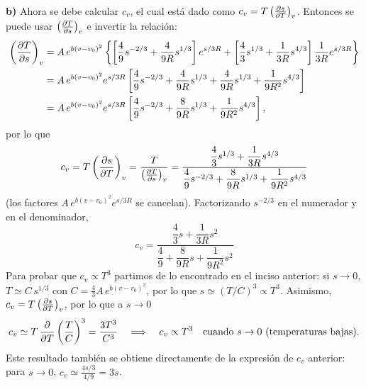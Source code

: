 \begin{solucion}
  \textbf{b)} Ahora se debe calcular $c_v$, el cual está dado como $c_v=T\left(\frac{\partial s}{\partial T}\right)_{v}$. Entonces se
  puede usar $\left(\frac{\partial T}{\partial s}\right)_{v}$ e invertir la relación:
  \begin{align*}
    \left(\frac{\partial T}{\partial s}\right)_{v}&=A\,e^{b(v-v_0)^{2}}\left\{\left[\frac{4}{9}s^{-2/3}+\frac{4}{9R}s^{1/3}\right]e^{s/3R}+\left[\frac{4}{3}s^{1/3}+\frac{1}{3R}s^{4/3}\right]\frac{1}{3R}e^{s/3R}\right\}\\
    &=A\,e^{b(v-v_0)^{2}}e^{s/3R}\left[\frac{4}{9}s^{-2/3}+\frac{4}{9R}s^{1/3}+\frac{4}{9R}s^{1/3}+\frac{1}{9R^{2}}s^{4/3}\right]\\
    &=A\,e^{b(v-v_0)^{2}}e^{s/3R}\left[\frac{4}{9}s^{-2/3}+\frac{8}{9R}s^{1/3}+\frac{1}{9R^{2}}s^{4/3}\right],
  \end{align*}
  por lo que
  \begin{equation*}
    c_v=T\left(\frac{\partial s}{\partial T}\right)_{v}=\frac{T}{\left(\frac{\partial T}{\partial s}\right)_{v}}
    =\frac{\dfrac{4}{3}s^{1/3}+\dfrac{1}{3R}s^{4/3}}{\dfrac{4}{9}s^{-2/3}+\dfrac{8}{9R}s^{1/3}+\dfrac{1}{9R^{2}}s^{4/3}}
  \end{equation*}
  (los factores $A\,e^{b(v-v_0)^{2}}e^{s/3R}$ se cancelan).
  Factorizando $s^{-2/3}$ en el numerador y en el denominador,
  \begin{equation*}
    \boxed{c_v=\frac{\dfrac{4}{3}s+\dfrac{1}{3R}s^{2}}{\dfrac{4}{9}+\dfrac{8}{9R}s+\dfrac{1}{9R^{2}}s^{2}}}
  \end{equation*}
  Para probar que $c_v\propto T^{3}$ partimos de lo encontrado en el inciso anterior: si $s\to0$,
  $T\simeq C\,s^{1/3}$ con $C=\frac{4}{3}A\,e^{b(v-v_0)^{2}}$, por lo que $s\simeq(T/C)^{3}\propto T^{3}$.
  Asimismo, $c_v=T\left(\frac{\partial s}{\partial T}\right)_{v}$, por lo que a $s\to0$
  \begin{equation*}
    c_v\simeq T\,\pdv{T}\left(\frac{T}{C}\right)^{3}=\frac{3T^{3}}{C^{3}}
    \quad\Longrightarrow\quad
    c_v\propto T^{3}\quad\text{cuando }s\to0\ \text{(temperaturas bajas)}.
  \end{equation*}
  Este resultado también se obtiene directamente de la expresión de $c_v$ anterior: para $s\to0$,
  $c_v\simeq\frac{4s/3}{4/9}=3s$.


\end{solucion}
